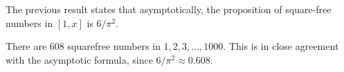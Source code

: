 \documentclass{unswmaths}
\begin{document}
\begin{remark}
    The previous result states that asymptotically, the proposition
    of square-free numbers in $[1,x]$ is $6/\pi^2$.
\end{remark}
\begin{remark}
    There are $608$ squarefree numbers in $1,2,3,\ldots,1000$. 
    This is in close agreement with the asymptotic formula,
    since $6/\pi^2 \approx 0.608$.
\end{remark}
\end{document}
